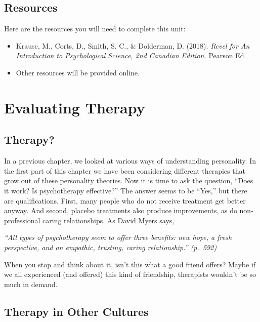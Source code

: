 \documentclass[
]{book}
\providecommand{\tightlist}{%
  \setlength{\itemsep}{0pt}\setlength{\parskip}{0pt}}
\begin{document}
\hypertarget{resources-12}{%
\subsection*{Resources}\label{resources-12}}

Here are the resources you will need to complete this unit:

\begin{itemize}
\tightlist
\item
  Krause, M., Corts, D., Smith, S. C., \& Dolderman, D. (2018). \emph{Revel for An Introduction to Psychological Science, 2nd Canadian Edition.} Pearson Ed.\\
\item
  Other resources will be provided online.
\end{itemize}

\hypertarget{evaluating-therapy}{%
\section{Evaluating Therapy}\label{evaluating-therapy}}

\hypertarget{therapy}{%
\subsection*{Therapy?}\label{therapy}}

In a previous chapter, we looked at various ways of understanding personality. In the first part of this chapter we have been considering different therapies that grow out of these personality theories. Now it is time to ask the question, ``Does it work? Is psychotherapy effective?'' The answer seems to be ``Yes,'' but there are qualifications. First, many people who do not receive treatment get better anyway. And second, placebo treatments also produce improvements, as do non-professional caring relationships. As David Myers says,

\emph{``All types of psychotherapy seem to offer three benefits: new hope, a fresh perspective, and an empathic, trusting, caring relationship.'' (p.~592)}

When you stop and think about it, isn't this what a good friend offers? Maybe if we all experienced (and offered) this kind of friendship, therapists wouldn't be so much in demand.

\hypertarget{therapy-in-other-cultures}{%
\subsection*{Therapy in Other Cultures}\label{therapy-in-other-cultures}}
\end{document}
